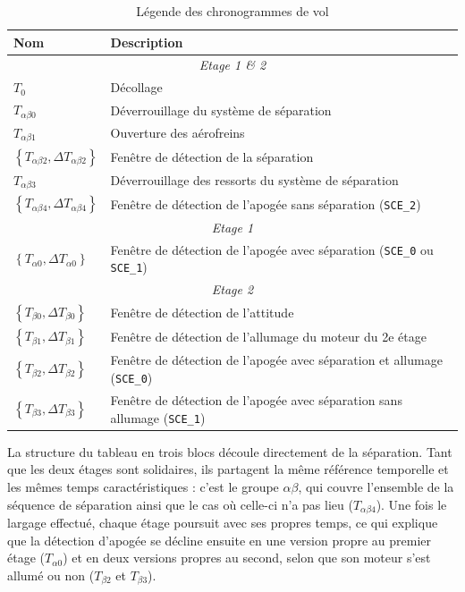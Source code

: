 \begin{table}[H]
    \centering
    \begin{tabular}{ll}
        \toprule
        Nom & Description \\
        \midrule
        \multicolumn{2}{c}{\textit{Etage 1 \& 2}} \\
        \midrule
        $T_0$ & Décollage \\
        $T_{\alpha\beta0}$ & Déverrouillage du système de séparation \\
        $T_{\alpha\beta1}$ & Ouverture des aérofreins \\
        $\left\{T_{\alpha\beta2}, \Delta T_{\alpha\beta2}\right\}$ & Fenêtre de détection de la séparation \\
        $T_{\alpha\beta3}$ & Déverrouillage des ressorts du système de séparation \\
        $\left\{T_{\alpha\beta4}, \Delta T_{\alpha\beta4}\right\}$ & Fenêtre de détection de l'apogée sans séparation (\texttt{SCE\_2}) \\
        \midrule
        \multicolumn{2}{c}{\textit{Etage 1}} \\
        \midrule
        $\left\{T_{\alpha0}, \Delta T_{\alpha0}\right\}$ & Fenêtre de détection de l'apogée avec séparation (\texttt{SCE\_0} ou \texttt{SCE\_1}) \\
        \midrule
        \multicolumn{2}{c}{\textit{Etage 2}} \\
        \midrule
        $\left\{T_{\beta0}, \Delta T_{\beta0}\right\}$ & Fenêtre de détection de l'attitude \\
        $\left\{T_{\beta1}, \Delta T_{\beta1}\right\}$ & Fenêtre de détection de l'allumage du moteur du 2e étage \\
        $\left\{T_{\beta2}, \Delta T_{\beta2}\right\}$ & Fenêtre de détection de l'apogée avec séparation et allumage (\texttt{SCE\_0}) \\
        $\left\{T_{\beta3}, \Delta T_{\beta3}\right\}$ & Fenêtre de détection de l'apogée avec séparation sans allumage (\texttt{SCE\_1}) \\
        \bottomrule
    \end{tabular}
    \caption{Légende des chronogrammes de vol}
    \label{tab:timeline_legende}
\end{table}

La structure du tableau en trois blocs découle directement de la séparation. Tant que les deux étages sont solidaires, ils
partagent la même référence temporelle et les mêmes temps caractéristiques : c'est le groupe $\alpha\beta$, qui couvre
l'ensemble de la séquence de séparation ainsi que le cas où celle-ci n'a pas lieu ($T_{\alpha\beta4}$). Une fois le largage
effectué, chaque étage poursuit avec ses propres temps, ce qui explique que la détection d'apogée se décline ensuite en une
version propre au premier étage ($T_{\alpha0}$) et en deux versions propres au second, selon que son moteur s'est allumé ou
non ($T_{\beta2}$ et $T_{\beta3}$).

